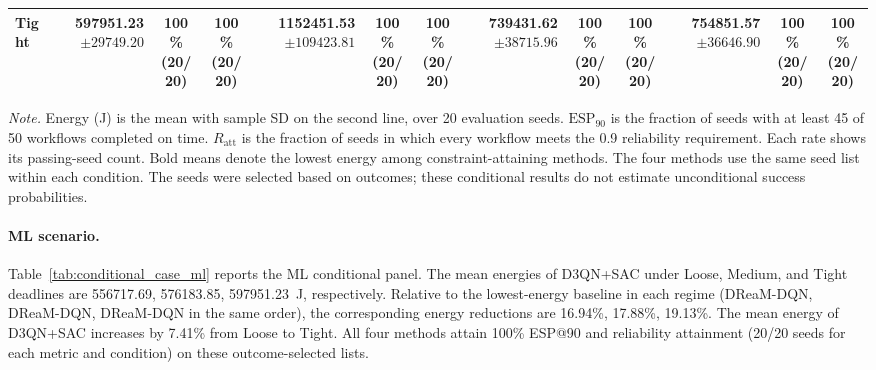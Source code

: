 \begin{table}[!t]
\begin{tabular}{@{}l*{4}{rcc}@{}}
Tight & \shortstack[r]{\textbf{597951.23}\\$\pm 29749.20$} & \shortstack[c]{100\%\\(20/20)} & \shortstack[c]{100\%\\(20/20)} & \shortstack[r]{1152451.53\\$\pm 109423.81$} & \shortstack[c]{100\%\\(20/20)} & \shortstack[c]{100\%\\(20/20)} & \shortstack[r]{739431.62\\$\pm 38715.96$} & \shortstack[c]{100\%\\(20/20)} & \shortstack[c]{100\%\\(20/20)} & \shortstack[r]{754851.57\\$\pm 36646.90$} & \shortstack[c]{100\%\\(20/20)} & \shortstack[c]{100\%\\(20/20)} \\
\bottomrule
\end{tabular}
\par\vspace{3pt}
\parbox{\textwidth}{\footnotesize
\textit{Note.} Energy (J) is the mean with sample SD on the second line, over 20 evaluation seeds.
$\mathrm{ESP}_{90}$ is the fraction of seeds with at least 45 of 50 workflows completed on time.
$R_{\mathrm{att}}$ is the fraction of seeds in which every workflow meets the 0.9 reliability requirement.
Each rate shows its passing-seed count. Bold means denote the lowest energy among constraint-attaining methods.
The four methods use the same seed list within each condition.
The seeds were selected based on outcomes; these conditional results do not estimate unconditional success probabilities.}
\endgroup
\end{table}

\paragraph{ML scenario.}
Table~\ref{tab:conditional_case_ml} reports the ML conditional panel. The mean energies of D3QN+SAC under Loose, Medium, and Tight deadlines are 556717.69, 576183.85, 597951.23~J, respectively. Relative to the lowest-energy baseline in each regime (DReaM-DQN, DReaM-DQN, DReaM-DQN in the same order), the corresponding energy reductions are 16.94\%, 17.88\%, 19.13\%. The mean energy of D3QN+SAC increases by 7.41\% from Loose to Tight. All four methods attain 100\% ESP@90 and reliability attainment (20/20 seeds for each metric and condition) on these outcome-selected lists.

